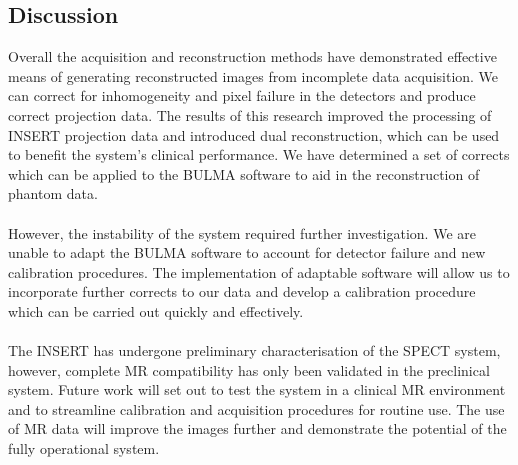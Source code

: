 \subsection{Discussion}
Overall the acquisition and reconstruction methods have demonstrated effective means of generating reconstructed images from incomplete data acquisition. We can correct for inhomogeneity and pixel failure in the detectors and produce correct projection data. The results of this research improved the processing of \acrshort{INSERT} projection data and introduced dual reconstruction, which can be used to benefit the system's clinical performance. We have determined a set of corrects which can be applied to the BULMA software to aid in the reconstruction of phantom data. 
\paragraph{}
However,  the instability of the system required further investigation. We are unable to adapt the BULMA software to account for detector failure and new calibration procedures. The implementation of adaptable software will allow us to incorporate further corrects to our data and develop a calibration procedure which can be carried out quickly and effectively. 
\paragraph{}
The \acrshort{INSERT} has undergone preliminary characterisation of the \acrshort{SPECT} system, however, complete \acrshort{MR} compatibility has only been validated in the preclinical system. Future work will set out to test the system in a clinical \acrshort{MR} environment and to streamline calibration and acquisition procedures for routine use. The use of \acrshort{MR} data will improve the images further and demonstrate the potential of the fully operational system.   

